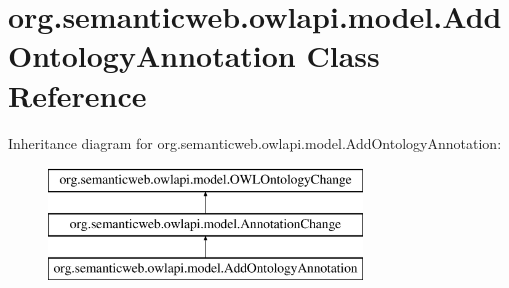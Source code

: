 \hypertarget{classorg_1_1semanticweb_1_1owlapi_1_1model_1_1_add_ontology_annotation}{\section{org.\-semanticweb.\-owlapi.\-model.\-Add\-Ontology\-Annotation Class Reference}
\label{classorg_1_1semanticweb_1_1owlapi_1_1model_1_1_add_ontology_annotation}
}
Inheritance diagram for org.\-semanticweb.\-owlapi.\-model.\-Add\-Ontology\-Annotation\-:\begin{figure}[H]
\begin{center}
\leavevmode
\includegraphics[height=3.000000cm]{classorg_1_1semanticweb_1_1owlapi_1_1model_1_1_add_ontology_annotation}
\end{center}
\end{figure}
